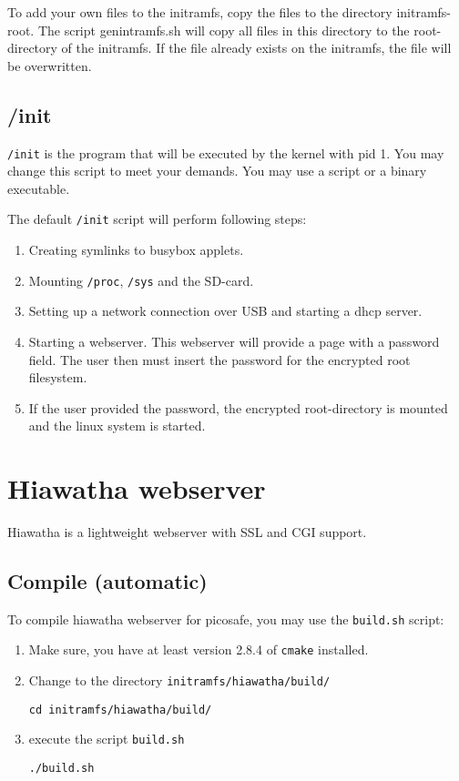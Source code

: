 To add your own files to the initramfs, copy the files to the directory
initramfs-root. The script genintramfs.sh will copy all files in this directory
to the root-directory of the initramfs. If the file already exists on the
initramfs, the file will be overwritten.

\subsection{/init}
\texttt{/init} is the program that will be executed by the kernel with pid 1.
You may change this script to meet your demands. You may use a script or a
binary executable.

The default \texttt{/init} script will perform following steps:
\begin{enumerate}
\item Creating symlinks to busybox applets.
\item Mounting \texttt{/proc}, \texttt{/sys} and the SD-card.
\item Setting up a network connection over USB and starting a dhcp server.
\item Starting a webserver. This webserver will provide a page with a password field. The user then must insert the password for the encrypted root filesystem.
\item If the user provided the password, the encrypted root-directory is mounted and the linux system is started.
\end{enumerate}

\section{Hiawatha webserver}

Hiawatha is a lightweight webserver with SSL and CGI support.

\subsection{Compile (automatic)}

To compile hiawatha webserver for picosafe, you may use the \texttt{build.sh} script:

\begin{enumerate}
\item Make sure, you have at least version 2.8.4 of \texttt{cmake} installed.
\item Change to the directory \texttt{initramfs/hiawatha/build/}

\texttt{cd initramfs/hiawatha/build/}
\item execute the script \texttt{build.sh}

\texttt{./build.sh}
\end{enumerate}

